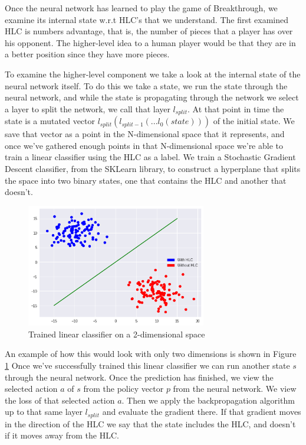 Once the neural network has learned to play the game of Breakthrough, we examine its internal state w.r.t HLC's that we understand. The first examined HLC is numbers advantage, that is, the number of pieces that a player has over his opponent. The higher-level idea to a human player would be that they are in a better position since they have more pieces.

To examine the higher-level component we take a look at the internal state of the neural network itself. To do this we take a state, we run the state through the neural network, and while the state is propagating through the network we select a layer to split the network, we call that layer $l_{split}$. At that point in time the state is a mutated vector $l_{split}(l_{split-1}(...l_0(state)))$ of the initial state. We save that vector as a point in the N-dimensional space that it represents, and once we've gathered enough points in that N-dimensional space we're able to train a linear classifier using the HLC as a label. We train a Stochastic Gradient Descent classifier, from the SKLearn library, to construct a hyperplane that splits the space into two binary states, one that contains the HLC and another that doesn't.

\begin{figure}[]
    \centering
    \includegraphics[width=0.7\textwidth]{graphics/linear_separation}
    \caption{Trained linear classifier on a 2-dimensional space}
    \label{fig:scattersplit}
\end{figure}

An example of how this would look with only two dimensions is shown in Figure \ref{fig:scattersplit} Once we've successfully trained this linear classifier we can run another state $s$ through the neural network. Once the prediction has finished, we view the selected action $a$ of $s$ from the policy vector $p$ from the neural network. We view the loss of that selected action $a$. Then we apply the backpropagation algorithm up to that same layer $l_{split}$ and evaluate the gradient there. If that gradient moves in the direction of the HLC we say that the state includes the HLC, and doesn't if it moves away from the HLC.

